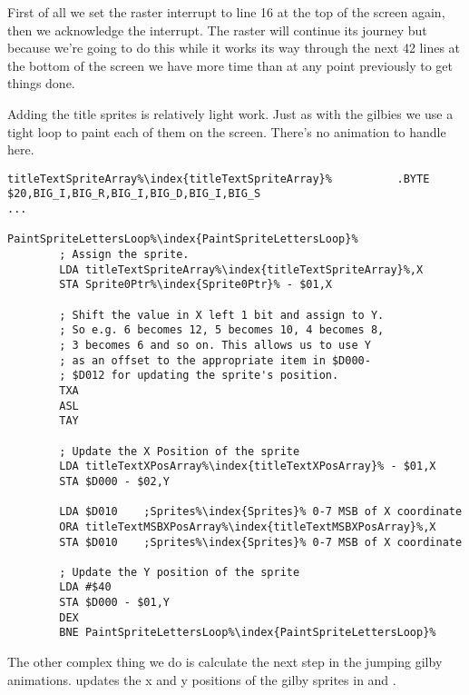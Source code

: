 First of all we set the raster interrupt to line 16 at the top of the screen again, then we acknowledge the interrupt. The
raster will continue its journey but because we're going to do this while it works its way through the next 42 lines at the bottom 
of the screen we have more time than at any point previously to get things done.

Adding the title sprites is relatively light work. Just as with the gilbies we use a tight loop to paint each of them
on the screen. There's no animation to handle here.

\begin{lstlisting}[escapechar=\%]
titleTextSpriteArray%\index{titleTextSpriteArray}%          .BYTE $20,BIG_I,BIG_R,BIG_I,BIG_D,BIG_I,BIG_S
...

PaintSpriteLettersLoop%\index{PaintSpriteLettersLoop}%   
        ; Assign the sprite.
        LDA titleTextSpriteArray%\index{titleTextSpriteArray}%,X
        STA Sprite0Ptr%\index{Sprite0Ptr}% - $01,X

        ; Shift the value in X left 1 bit and assign to Y.
        ; So e.g. 6 becomes 12, 5 becomes 10, 4 becomes 8,
        ; 3 becomes 6 and so on. This allows us to use Y
        ; as an offset to the appropriate item in $D000-
        ; $D012 for updating the sprite's position.
        TXA
        ASL
        TAY

        ; Update the X Position of the sprite
        LDA titleTextXPosArray%\index{titleTextXPosArray}% - $01,X
        STA $D000 - $02,Y

        LDA $D010    ;Sprites%\index{Sprites}% 0-7 MSB of X coordinate
        ORA titleTextMSBXPosArray%\index{titleTextMSBXPosArray}%,X
        STA $D010    ;Sprites%\index{Sprites}% 0-7 MSB of X coordinate

        ; Update the Y position of the sprite
        LDA #$40
        STA $D000 - $01,Y
        DEX
        BNE PaintSpriteLettersLoop%\index{PaintSpriteLettersLoop}%

\end{lstlisting}

The other complex thing we do is calculate the next step in the jumping gilby animations. 
updates the x and y positions of the gilby sprites in  and .

